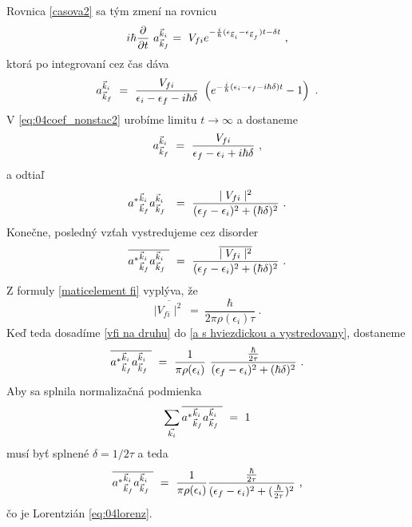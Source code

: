 Rovnica \eqref{casova2}  sa tým zmení na rovnicu
\begin{equation}
\label{casova3}
i\hbar \frac{\partial}{\partial t}\ a^{\vec{k}_i}_{\vec{k}_f}=
\ V_{fi} e^{-\frac{i}{\hbar}(\epsilon_{\vec{k}_i}-\epsilon_{\vec{k}_f})t-\delta t}
\ \text{,}
\end{equation}
ktorá po integrovaní cez čas dáva
 \begin{align}
\label{eq:04coef_nonstac2}
a^{\vec{k}_i}_{\vec{k}_f} \ = \
\frac{V_{fi}}{\epsilon_i-\epsilon_f-i\hbar\delta}
\ \left(
e^{-\frac{i}{\hbar}(\epsilon_i-\epsilon_f- i\hbar\delta)t}-1
\right)
\ \text{.}
\end{align}
V \eqref{eq:04coef_nonstac2} urobíme limitu $ t \to \infty $   a dostaneme
\begin{equation}
\label{limita t nekonecno}
a^{\vec{k}_i}_{\vec{k}_f} \ = \
\frac{V_{fi}}{\epsilon_f-\epsilon_i+ i\hbar\delta}
\ \text{,}
\end{equation}
a odtiaľ
\begin{equation}
\label{a s hviezdickou a}
{a^{\ast}}^{\vec{k}_i}_{\vec{k}_f} a^{\vec{k}_i}_{\vec{k}_f} \
\ = \
\frac{\mid V_{fi} \mid^{2}}
{(\epsilon_f-\epsilon_i)^{2}+(\hbar\delta)^{2}}
\ \text{.}
\end{equation}
Konečne, posledný vzťah vystredujeme cez disorder
\begin{equation}
\label{a s hviezdickou a vystredovany}
\overline{
{a^{\ast}}^{\vec{k}_i}_{\vec{k}_f} a^{\vec{k}_i}_{\vec{k}_f} \
}
\ = \
\frac{
\overline{\mid V_{fi} \mid^{2}}
}
{(\epsilon_f-\epsilon_i)^{2}+(\hbar\delta)^{2}}
\ \text{.}
\end{equation}
Z formuly \eqref{maticelement fi} vyplýva, že
\begin{equation}
\label{vfi na druhu}
\overline{\mid V_{fi} \mid^{2}}
\ = \
\frac{\hbar} {2\pi \rho(\epsilon_i) \tau}
\ \text{.}
\end{equation}
Keď teda dosadíme  \eqref{vfi na druhu}
do \eqref{a s hviezdickou a vystredovany},
dostaneme
\begin{equation}
\label{a s hviezdickou a final}
\overline{
{a^{\ast}}^{\vec{k}_i}_{\vec{k}_f} a^{\vec{k}_i}_{\vec{k}_f} \
}
\ = \
\frac{1}{\pi \rho(\epsilon_i)} \
\frac{ \frac{\hbar}{2\tau}}
{(\epsilon_f-\epsilon_i)^{2}+(\hbar\delta)^{2}}
\ \text{.}
\end{equation}
Aby sa splnila normalizačná podmienka
\begin{equation}
\label{normalizacia}
\sum_{\vec{k_i}}
\overline{
{a^{\ast}}^{\vec{k}_i}_{\vec{k}_f} a^{\vec{k}_i}_{\vec{k}_f} \
}
\ = \
1
\end{equation}
musí byť splnené $\delta =1/2\tau$
a teda
\begin{equation}
\label{thoules ansatz final}
\overline{
{a^{\ast}}^{\vec{k}_i}_{\vec{k}_f} a^{\vec{k}_i}_{\vec{k}_f} \
}
\ = \
\frac{1}{\pi \rho(\epsilon_i)}
\frac{ \frac{\hbar}{2\tau}}
{(\epsilon_f-\epsilon_i)^{2}+(\frac{\hbar}{2\tau})^{2}}
\ \text{,}
\end{equation}
čo je Lorentzián \eqref{eq:04lorenz}. 


